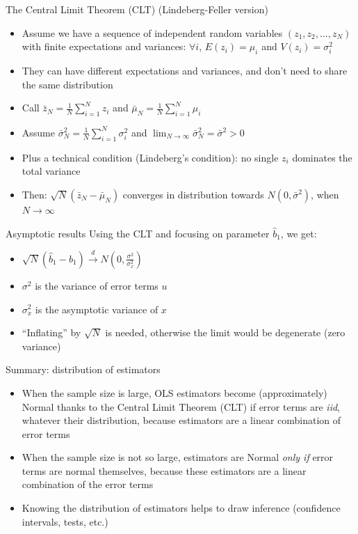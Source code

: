 \documentclass[aspectratio=169]{beamer}
\begin{document}
\begin{frame}{The Central Limit Theorem (CLT)}
(Lindeberg-Feller version)

\begin{itemize}
    \item Assume we have a sequence of independent random variables $(z_1, z_2, \dots, z_N)$ with finite expectations and variances: $\forall i$, $E(z_i) = \mu_i$ and $V(z_i) = \sigma_i^2$
    \item They can have different expectations and variances, and don't need to share the same distribution
    \item Call $\bar{z}_N = \frac{1}{N}\sum_{i=1}^{N} z_i$ and $\bar{\mu}_N = \frac{1}{N}\sum_{i=1}^{N} \mu_i$
    \item Assume $\bar{\sigma}_N^2 = \frac{1}{N}\sum_{i=1}^{N} \sigma_i^2$ and $\lim_{N\to\infty} \bar{\sigma}_N^2 = \bar{\sigma}^2 > 0$
    \item Plus a technical condition (Lindeberg's condition): no single $z_i$ dominates the total variance
    \item Then: $\sqrt{N}(\bar{z}_N - \bar{\mu}_N)$ converges in distribution towards $N(0, \bar{\sigma}^2)$, when $N \to \infty$
\end{itemize}
\end{frame}

\begin{frame}{Asymptotic results}
Using the CLT and focusing on parameter $\hat{b}_1$, we get:

\begin{itemize}
    \item $\sqrt{N}(\hat{b}_1 - b_1) \xrightarrow{d} N\left(0, \frac{\sigma^2}{\sigma_x^2}\right)$
    \item $\sigma^2$ is the variance of error terms $u$
    \item $\sigma_x^2$ is the asymptotic variance of $x$
    \item ``Inflating'' by $\sqrt{N}$ is needed, otherwise the limit would be degenerate (zero variance)
\end{itemize}
\end{frame}

\begin{frame}{Summary: distribution of estimators}
\begin{itemize}
    \item When the sample size is large, OLS estimators become (approximately) Normal thanks to the Central Limit Theorem (CLT) if error terms are \textit{iid}, whatever their distribution, because estimators are a linear combination of error terms
    \item When the sample size is not so large, estimators are Normal \textit{only if} error terms are normal themselves, because these estimators are a linear combination of the error terms
    \item Knowing the distribution of estimators helps to draw inference (confidence intervals, tests, etc.)
\end{itemize}
\end{frame}
\end{document}
